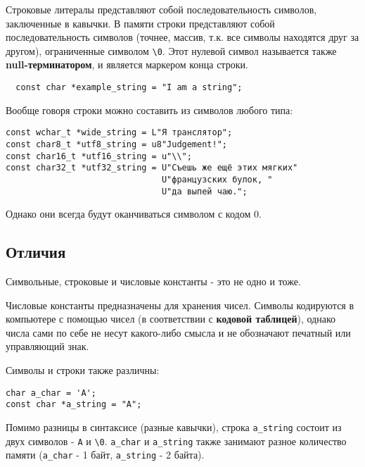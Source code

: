 Строковые литералы представляют собой последовательность символов,
заключенные в кавычки. В памяти строки представляют собой
последовательность символов (точнее, массив, т.к. все символы находятся
друг за другом), ограниченные символом \texttt{\textbackslash{}0}. Этот
нулевой символ называется также \textbf{null-терминатором}, и является
маркером конца строки.
\begin{verbatim}
  const char *example_string = "I am a string";
\end{verbatim}
Вообще говоря строки можно составить из символов любого типа:
\begin{verbatim}
const wchar_t *wide_string = L"Я транслятор";
const char8_t *utf8_string = u8"Judgement!";
const char16_t *utf16_string = u"\\";
const char32_t *utf32_string = U"Съешь же ещё этих мягких"
                               U"французских булок, "
                               U"да выпей чаю.";
\end{verbatim}

Однако они всегда будут оканчиваться символом с кодом 0.

\subsection{Отличия}\label{ux43eux442ux43bux438ux447ux438ux44f}

Символьные, строковые и числовые константы - это не одно и тоже.

Числовые константы предназначены для хранения чисел. Символы кодируются
в компьютере с помощью чисел (в соответствии с \textbf{кодовой
таблицей}), однако числа сами по себе не несут какого-либо смысла и не
обозначают печатный или управляющий знак.

Символы и строки также различны:
\begin{verbatim}
char a_char = 'A';
const char *a_string = "A";
\end{verbatim}

Помимо разницы в синтаксисе (разные кавычки), строка \texttt{a\_string}
состоит из двух символов -
\texttt{\textquotesingle{}A\textquotesingle{}} и
\texttt{\textquotesingle{}\textbackslash{}0\textquotesingle{}}.
\texttt{a\_char} и \texttt{a\_string} также занимают разное количество
памяти (\texttt{a\_char} - 1 байт, \texttt{a\_string} - 2 байта).
